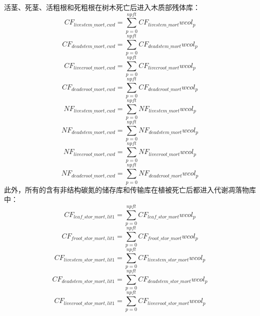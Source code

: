 活茎、死茎、活粗根和死粗根在树木死亡后进入木质部残体库：
\begin{equation}
  CF_{livestem\_{mort},cwd}=\sum_{p=0}^{npft}{CF_{livestem\_{mort}}{wcol_p}}
\end{equation}
\begin{equation}
  CF_{deadstem\_{mort},cwd}=\sum_{p=0}^{npft}{CF_{deadstem\_{mort}}{wcol_p}}
\end{equation}
\begin{equation}
  CF_{livecroot\_{mort},cwd}=\sum_{p=0}^{npft}{CF_{livecroot\_{mort}}{wcol_p}}
\end{equation}
\begin{equation}
  CF_{deadcroot\_{mort},cwd}=\sum_{p=0}^{npft}{CF_{deadcroot\_{mort}}{wcol_p}}
\end{equation}
\begin{equation}
  NF_{livestem\_{mort},cwd}=\sum_{p=0}^{npft}{NF_{livestem\_{mort}}{wcol_p}}
\end{equation}
\begin{equation}
  NF_{deadstem\_{mort},cwd}=\sum_{p=0}^{npft}{NF_{deadstem\_{mort}}{wcol_p}}
\end{equation}
\begin{equation}
  NF_{livecroot\_{mort},cwd}=\sum_{p=0}^{npft}{NF_{livecroot\_{mort}}{wcol_p}}
\end{equation}
\begin{equation}
  NF_{deadcroot\_{mort},cwd}=\sum_{p=0}^{npft}{NF_{deadcroot\_{mort}}{wcol_p}}
\end{equation}
此外，所有的含有非结构碳氮的储存库和传输库在植被死亡后都进入代谢凋落物库中：
\begin{equation}
  CF_{leaf\_{{stor}\_{mort}},lit1}=\sum_{p=0}^{npft}{CF_{leaf\_{{stor}\_{mort}}}{wcol_p}}
\end{equation}
\begin{equation}
  CF_{froot\_{{stor}\_{mort}},lit1}=\sum_{p=0}^{npft}{CF_{froot\_{{stor}\_{mort}}}{wcol_p}}
\end{equation}
\begin{equation}
  CF_{livestem\_{{stor}\_{mort}},lit1}=\sum_{p=0}^{npft}{CF_{livestem\_{{stor}\_{mort}}}{wcol_p}}
\end{equation}
\begin{equation}
  CF_{deadstem\_{{stor}\_{mort}},lit1}=\sum_{p=0}^{npft}{CF_{deadstem\_{{stor}\_{mort}}}{wcol_p}}
\end{equation}
\begin{equation}
  CF_{livecroot\_{{stor}\_{mort}},lit1}=\sum_{p=0}^{npft}{CF_{livecroot\_{{stor}\_{mort}}}{wcol_p}}
\end{equation}
